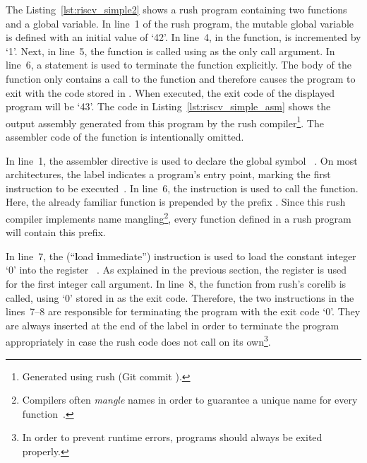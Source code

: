 The Listing~\ref{lst:riscv_simple2} shows a rush program containing two functions and a global variable.
In line~1 of the rush program, the mutable global variable  is defined with an initial value of `42'.
In line~4, in the  function,  is incremented by `1'.
Next, in line~5, the  function is called using  as the only call argument.
In line~6, a  statement is used to terminate the  function explicitly.
The body of the  function only contains a call to the  function and therefore causes the program to exit with the code stored in .
When executed, the exit code of the displayed program will be `43'.
The code in Listing~\ref{lst:riscv_simple_asm} shows the output assembly generated from this program by the rush \riscv{} compiler\footnote{Generated using rush (Git commit \rushCommit{}).}.
The assembler code of the  function is intentionally omitted.

In line~1, the  assembler directive is used to declare the global symbol ~\cite[p.~36]{Patterson2017}.
On most architectures, the  label indicates a program's entry point, marking the first instruction to be executed~\cite[p.~19]{Zhirkov2017-wk}.
In line~6, the  instruction is used to call the  function.
Here, the already familiar  function is prepended by the prefix .
Since this rush compiler implements name mangling\footnote{Compilers often \emph{mangle} names in order to guarantee a unique name for every function~\cite[pp.~119-120]{Levine2000}.},
every function defined in a rush program will contain this prefix.


In line~7, the  (\enquote{\textbf{l}oad \textbf{i}mmediate}) instruction is used to load the constant integer `0' into the register ~\cite[Reference Card]{Patterson2017}.
As explained in the previous section, the register  is used for the first integer call argument.
In line~8, the  function from rush's corelib is called, using `0' stored in  as the exit code.
Therefore, the two instructions in the lines~7--8 are responsible for terminating the program with the exit code `0'.
They are always inserted at the end of the  label in order to terminate the program appropriately in case the rush code does not call  on its own\footnote{In order to prevent runtime errors, programs should always be exited properly.}.

